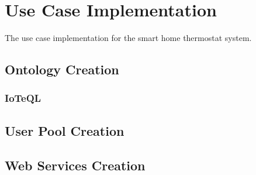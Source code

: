 \chapter{Use Case Implementation}

The use case implementation for the smart home thermostat system.

\section{Ontology Creation}

\subsection{IoTeQL}

  

\section{User Pool Creation}

\section{Web Services Creation}